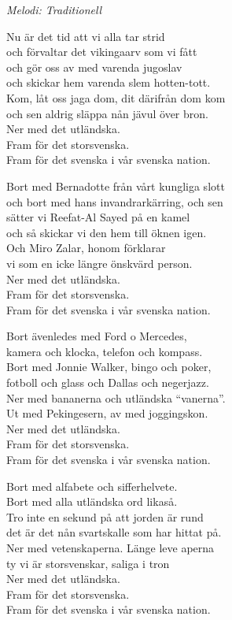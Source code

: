 {\footnotesize\textit{Melodi: Traditionell}}\par
\vspace{10pt}
Nu är det tid att vi alla tar strid\\
och förvaltar det vikingaarv som vi fått\\
och gör oss av med varenda jugoslav\\
och skickar hem varenda slem hotten-tott.\\
Kom, låt oss jaga dom, dit därifrån dom kom\\
och sen aldrig släppa nån jävul över bron.\\
Ner med det utländska.\\
Fram för det storsvenska.\\
Fram för det svenska i vår svenska nation. \par
\vspace{10pt}
Bort med Bernadotte från vårt kungliga slott\\
och bort med hans invandrarkärring, och sen\\
sätter vi Reefat-Al Sayed på en kamel\\
och så skickar vi den hem till öknen igen.\\
Och Miro Zalar, honom förklarar\\
vi som en icke längre önskvärd person.\\
Ner med det utländska.\\
Fram för det storsvenska.\\
Fram för det svenska i vår svenska nation. \par
\vspace{10pt}
Bort ävenledes med Ford o Mercedes,\\
kamera och klocka, telefon och kompass.\\
Bort med Jonnie Walker, bingo och poker,\\
fotboll och glass och Dallas och negerjazz.\\
Ner med bananerna och utländska ``vanerna''.\\
Ut med Pekingesern, av med joggingskon.\\
Ner med det utländska.\\
Fram för det storsvenska.\\
Fram för det svenska i vår svenska nation. \par
\vspace{10pt}
Bort med alfabete och sifferhelvete.\\
Bort med alla utländska ord likaså.\\
Tro inte en sekund på att jorden är rund\\
det är det nån svartskalle som har hittat på.\\
Ner med vetenskaperna. Länge leve aperna\\
ty vi är storsvenskar, saliga i tron\\
Ner med det utländska.\\
Fram för det storsvenska.\\
Fram för det svenska i vår svenska nation. 
